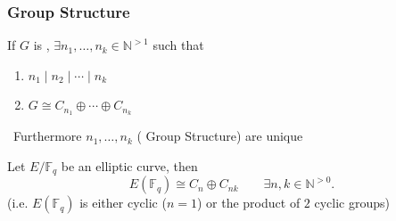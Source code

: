 \documentclass[handout]{beamer}%
\newcommand{\N}{\mathbb N}
\newcommand{\F}{\mathbb F}
\theoremstyle{definition}
\begin{document}
\begin{frame}%
 \frametitle{Group Structure}

\begin{theorem}
 If $G$ is {\color[rgb]{0.9,0.3,0.2}{abelian and finite}},  $\exists n_1,\ldots,n_k\in\N^{>1}$ such that
 \begin{enumerate}[<+-| alert@+>]
\item $n_1\mid n_2\mid\cdots\mid n_k$
\item $G\cong C_{n_1}\oplus\cdots\oplus C_{n_k}$
\end{enumerate}
\ \hfill Furthermore $n_1,\ldots,n_k$ ({\color[rgb]{0.9,0.3,0.2} Group Structure}) are unique
 \end{theorem}\pause


\begin{theorem} Let $E/\F_q$ be 
an elliptic curve, then
$$E(\F_q)\cong C_n\oplus C_{nk}\qquad\exists n,k\in\N^{>0}.$$
(i.e. $E(\F_q)$ is either cyclic ($n=1$) or the product of $2$ cyclic groups)
\pause
\end{theorem}            
\end{frame}
\end{document}

